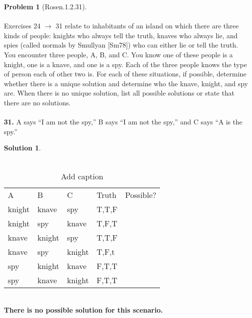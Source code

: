 \documentclass{article}
\theoremstyle{definition}
\newtheorem*{problem}{Problem}
\newtheorem*{solution}{Solution}
\begin{document}
\begin{problem}[Rosen.1.2.31]\ \\
\ \\
Exercises 24 $\rightarrow$ 31 relate to inhabitants of an island on which
there are three kinds of people: knights who always tell the
truth, knaves who always lie, and spies (called normals by
Smullyan [Sm78]) who can either lie or tell the truth. You
encounter three people, A, B, and C. You know one of these
people is a knight, one is a knave, and one is a spy. Each of the
three people knows the type of person each of other two is. For
each of these situations, if possible, determine whether there
is a unique solution and determine who the knave, knight, and
spy are. When there is no unique solution, list all possible
solutions or state that there are no solutions.\ \\
\ \\
\textbf{31.} A says “I am not the spy,” B says “I am not the spy,” and C says “A is the spy.”
\begin{compactenum}
\renewcommand{\theenumi}{\alph{enumi}}

\end{compactenum}
\end{problem}

\begin{solution}\ \\
\ \\
\begin{compactenum}
\renewcommand{\theenumi}{\alph{enumi}}
\begin{table}[htbp]
  \centering
  \caption{Add caption}
    \begin{tabular}{llllr}
    A     & B     & C     & Truth & \multicolumn{1}{l}{Possible?} \\
    knight & knave & spy   & T,T,F &  \\
    knight & spy   & knave & T,F,T &  \\
    knave & knight & spy   & T,T,F &  \\
    knave & spy   & knight & T,F,t &  \\
    spy   & knight & knave & F,T,T &  \\
    spy   & knave & knight & F,T,T &  \\
    \end{tabular}%
  \label{tab:addlabel}%
\end{table}%

\ \\
\textbf{There is no possible solution for this scenario.}

\end{compactenum}
\end{solution}
\end{document}
